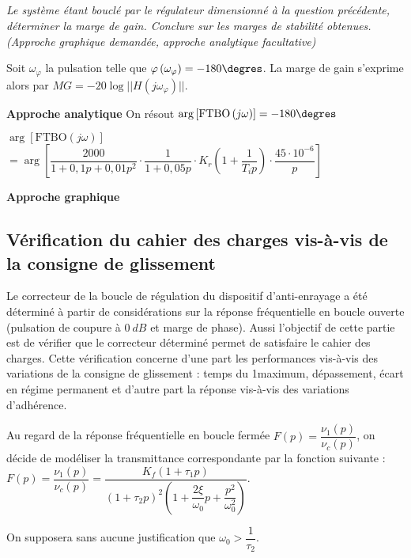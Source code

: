 \begin{multicols}{2}
\subparagraph{}\textit{Le système étant bouclé par le régulateur dimensionné à la question
précédente, déterminer la marge de gain. Conclure sur les marges de stabilité obtenues. (Approche graphique demandée, approche analytique facultative)}
\begin{methode}
Soit $\omega_{\varphi}$ la pulsation telle que $\varphi\left(\omega_{\varphi} \right)=-180\degres$. La marge de gain s'exprime alors par $MG=-20\log||H\left(j \omega_{\varphi} \right)||$.
\end{methode}


\begin{corrige}
\textbf{Approche analytique}
On résout $\arg \left[\text{FTBO}\left( j \omega\right)\right] = -180 \degres$ 


$\arg \left[\text{FTBO}\left( j \omega\right)\right]$ 
$ = \arg \left[
\dfrac{2000}{1+0,1p+0,01p^2}
\cdot
\dfrac{1}{1+0,05p}
\cdot 
K_r
 \left(1+\dfrac{1}{T_i p} \right) \cdot 
\dfrac{45\cdot 10^{-6}}{p}
\right] $


\textbf{Approche graphique}

\end{corrige}
\else
\fi

\subsection*{Vérification du cahier des charges vis-à-vis de la consigne de glissement}
\ifprof
\else
Le correcteur de la boucle de régulation du dispositif d’anti-enrayage a été déterminé
à partir de considérations sur la réponse fréquentielle en boucle ouverte
(pulsation de coupure à $\SI{0}{dB}$ et marge de phase). Aussi l’objectif de cette partie
est de vérifier que le correcteur déterminé permet de satisfaire le cahier des charges.
Cette vérification concerne d’une part les performances vis-à-vis des variations
de la consigne de glissement : temps du 1\ier maximum, dépassement, écart
en régime permanent et d’autre part la réponse vis-à-vis des variations d’adhérence.

Au regard de la réponse fréquentielle en boucle fermée $F(p)=\dfrac{\nu_1(p)}{\nu_c(p)}$, on
décide de modéliser la transmittance correspondante par la fonction suivante :
$ F(p)=\dfrac{\nu_1(p)}{\nu_c(p)}=\dfrac{K_f\left( 1+\tau_1 p\right)}{\left( 1+\tau_2 p\right)^2 \left({1+\dfrac{2 \xi }{\omega_0}p+\dfrac{p^2}{\omega_0^2}} \right)} $.

On supposera sans aucune justification que $\omega_0 > \dfrac{1}{\tau_2}$.


\end{multicols}
